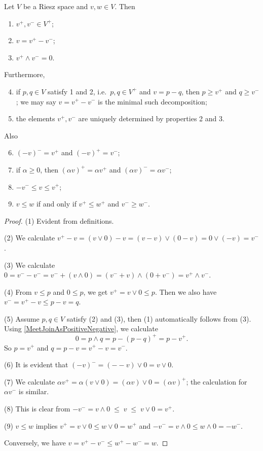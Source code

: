 \begin{proposition} \label{PositiveNegativeElements} \label{minimalPositiveDecomposition} 
Let $V$ be a Riesz space and $v,w\in V$. Then
\begin{enumerate}
\item $v^+, v^- \in V^+$;
\item $v= v^+ - v^-$;
\item $v^+ \wedge v^- = 0$.
\end{enumerate}
Furthermore,
\begin{enumerate} \setcounter{enumi}{3}
\item if $p,q\in V$ satisfy 1 and 2, i.e.\ $p,q\in V^+$ and $v = p-q$, then $p \geq v^+$ and $q \geq v^-$; we may say $v=v^+-v^-$ is the minimal such decomposition; 
\item the elements $v^+, v^-$ are uniquely determined by properties 2 and 3. 
\end{enumerate}
Also
\begin{enumerate} \setcounter{enumi}{5}
\item $(-v)^- = v^+$ and $(-v)^+ = v^-$;
\item if $\alpha \geq 0$, then $(\alpha v)^+ = \alpha v^+$ and $(\alpha v)^- = \alpha v^-$;
\item $-v^- \leq v \leq v^+$;
\item $v\leq w$ \textup{if and only if} $v^+ \leq w^+$ and $v^- \geq w^-$.
\end{enumerate}
\end{proposition}
\begin{proof}
(1) Evident from definitions.

(2) We calculate $v^+ - v = (v \vee 0) - v = (v-v) \vee (0-v) = 0\vee (-v) = v^-$.

(3) We calculate $0 = v^- - v^- = v^-  + (v\wedge 0) = (v^- + v)\wedge (0 + v^-) = v^+ \wedge v^-$.

(4) From $v\leq p$ and $0\leq p$, we get $v^+ = v \vee 0 \leq p$. Then we also have $v^- = v^+ - v \leq p - v = q$.

(5) Assume $p,q\in V$ satisfy (2) and (3), then (1) automatically follows from (3). Using \ref{MeetJoinAsPositiveNegative}, we calculate
\[ 0 = p\wedge q = p - (p-q)^+ = p - v^+. \]
So $p = v^+$ and $q = p - v = v^+ - v = v^-$.

(6) It is evident that $(-v)^- = (--v)\vee 0 = v\vee 0$.

(7) We calculate $\alpha v^+ = \alpha (v \vee 0) = (\alpha v) \vee 0 = (\alpha v)^+$; the calculation for $\alpha v^-$ is similar.

(8) This is clear from $-v^- = v\wedge 0 \;\leq\; v \;\leq\; v \vee 0 = v^+$.

(9) $v\leq w$ implies $v^+ = v\vee 0 \leq w\vee 0 = w^+$ and $-v^- = v\wedge 0 \leq w\wedge 0 = - w^-$.

Conversely, we have $v = v^+ - v^- \leq w^+ - w^- = w$.
\end{proof}


